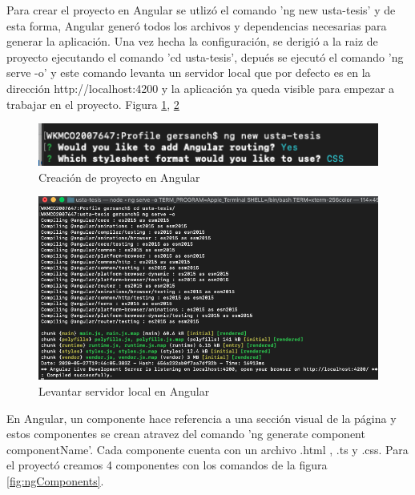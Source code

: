         Para crear el proyecto en Angular se utlizó el comando 'ng new usta-tesis' y de esta forma, Angular generó todos los archivos y dependencias necesarias para generar la aplicación. Una vez hecha la configuración, se derigió a la raiz de proyecto ejecutando el comando 'cd usta-tesis', depués se ejecutó el comando 'ng serve -o' y este comando levanta un servidor local que por defecto es en la dirección http://localhost:4200 y la aplicación ya queda visible para empezar a trabajar en el proyecto. Figura \ref{fig:ngNew}, \ref{fig:ngServe}\\

        \begin{figure}[H]
            \begin{center}
                \includegraphics[width = 15cm]{3Proyecto/ngNew}
                \caption{ Creación de proyecto en Angular} 
                \label{fig:ngNew}
           \end{center}
        \end{figure}
        \begin{figure}[H]
            \begin{center}
                \includegraphics[width = 15cm]{3Proyecto/ngServe}
                \caption{ Levantar servidor local en Angular} 
                \label{fig:ngServe}
           \end{center}
        \end{figure}
        En Angular, un componente hace referencia a una sección visual de la página y estos componentes se crean atravez del comando 'ng generate component componentName'. Cada componente cuenta con un archivo .html , .ts y .css. Para el proyectó creamos 4 componentes con los comandos de la figura \ref{fig:ngComponents}.\\
